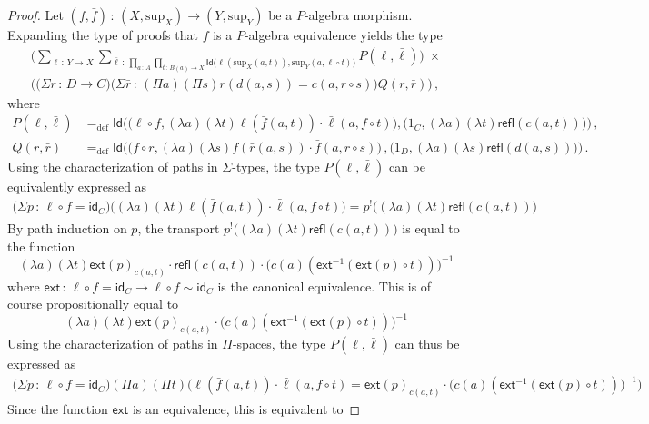 \documentclass[10pt,a4paper,oneside,reqno]{amsart}
\theoremstyle{mythm}
\theoremstyle{mydef}
\theoremstyle{myrmk}
\newcommand{\defeq}{=_{\mathrm{def}}}
\newcommand{\co}{\,{:}\,}
\newcommand{\com}{\circ}
\newcommand{\idfun}[1]{\mathsf{id}_{#1}}
\newcommand{\ct}{\cdot}
\newcommand{\ext}{\mathsf{ext}}
\newcommand{\Id}{\mathsf{Id}}
\newcommand{\refl}{\mathsf{refl}}
\renewcommand{\sup}{\mathrm{sup}}
\begin{document}
\begin{proof} Let $(f, \bar{f}) \co (X, \sup_X) \to (Y, \sup_Y)$ be a  $P$-algebra morphism. Expanding the type of proofs that $f$ is a 
$P$-algebra equivalence yields the type
\begin{multline*}
 \Big(
 \sum_{\ell \co Y \to X} \sum_{\bar{\ell} \co  \prod_{a \co A} \prod_{t \co B(a) \to X} \Id \big( \ell( \sup_X(a,t)) , \sup_Y(a, \ell \circ t) \big)}
 P(\ell,\bar{\ell})\Big) \; \times \\ 
 \Big(\big(\Sigma r \co D \to C \big) \big(\Sigma \bar{r} \co (\Pi a) (\Pi s) r(d(a,s))=c(a,r \circ s) \big) Q(r,\bar{r})  \Big)\, , 
\end{multline*}
where
\begin{align*}
P(\ell,\bar{\ell}) & \defeq \Id \Big( \big( \ell \com f, (\lambda a)(\lambda t) \ell(\bar{f}(a,t)) \ct \bar{\ell}(a, f \com t)\big), \big( 1_C, (\lambda a)(\lambda t) \refl(c(a,t))\big) \Big)  \, , \\
Q(r,\bar{r})    & \defeq \Id \Big( \big( f \com r, (\lambda a)(\lambda s) f(\bar{r}(a,s)) \ct \bar{f}(a, r \com s)\big) \, , \big( 1_D, (\lambda a)(\lambda s) \refl(d(a,s)) \big) \Big) \, .
\end{align*}
Using the characterization of paths in $\Sigma$-types, the type $P(\ell,\bar{\ell})$ can be equivalently expressed as
\begin{align*}
\big(\Sigma p \co \ell \com f = \idfun{C} \big) \Big((\lambda a) (\lambda t) \ell(\bar{f}(a,t)) \ct \bar{\ell}(a, f \com t)\Big) = p^{!} \Big((\lambda a) (\lambda t) \refl(c(a,t))\Big) 
\end{align*}
By path induction on $p$, the transport $p^{!} \Big((\lambda a) (\lambda t) \refl(c(a,t))\Big)$ is equal to the function
\[ (\lambda a) (\lambda t) \ext(p)_{c(a,t)} \ct \refl(c(a,t)) \ct \big(c(a)(\ext^{-1}(\ext(p) \circ t))\big)^{-1} \]
where $\ext \co \ell \com f = \idfun{C} \to \ell \com f \sim \idfun{C}$ is the canonical equivalence. This is of course propositionally equal to
\[ (\lambda a) (\lambda t) \ext(p)_{c(a,t)} \ct \big(c(a)(\ext^{-1}(\ext(p) \circ t))\big)^{-1} \]
Using the characterization of paths in $\Pi$-spaces, the type $P(\ell,\bar{\ell})$ can thus be expressed as
\begin{align*}
\big(\Sigma p \co \ell \com f = \idfun{C} \big) (\Pi a) (\Pi t) \Big(\ell(\bar{f}(a,t)) \ct \bar{\ell}(a, f \com t) = \ext(p)_{c(a,t)} \ct \big(c(a)(\ext^{-1}(\ext(p) \circ t))\big)^{-1}\Big)
\end{align*}
Since the function $\ext$ is an equivalence, this is equivalent to

\end{proof}
\end{document}
